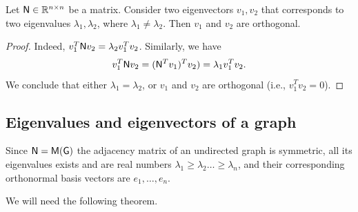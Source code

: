 \begin{lemma}
    Let $\mathsf{N} \in \mathbb{R}^{n \times n}$ be a matrix.  Consider two
    eigenvectors $v_1, v_2$ that corresponds to two eigenvalues
    $\lambda_1, \lambda_2$, where $\lambda_1 \neq \lambda_2$. Then
    $v_1$ and $v_2$ are orthogonal.
\end{lemma}
\begin{proof}
    Indeed, $v_1^T \mathsf{N} v_2 = \lambda_2 v_1^T v_2$. Similarly, we have
    \[
    v_1^T \mathsf{N} v_2 = (\mathsf{N}^T v_1)^T v_2) =\lambda_1 v_1^T v_2.
    \]
    We
    conclude that either $\lambda_1 = \lambda_2$, or $v_1$ and $v_2$
    are orthogonal (i.e., $v_1^T v_2 = 0$).
\end{proof}


\subsection{Eigenvalues and eigenvectors of a graph}

Since $\mathsf{N} = \mathsf{M}(\mathsf{G})$ the adjacency matrix of an undirected
graph is symmetric, all its eigenvalues exists and are real numbers
$\lambda_1 \geq \lambda_2 \dots\geq \lambda_n$, and their
corresponding orthonormal basis vectors are $e_1,\ldots, e_n$.



We will
need the following theorem.


